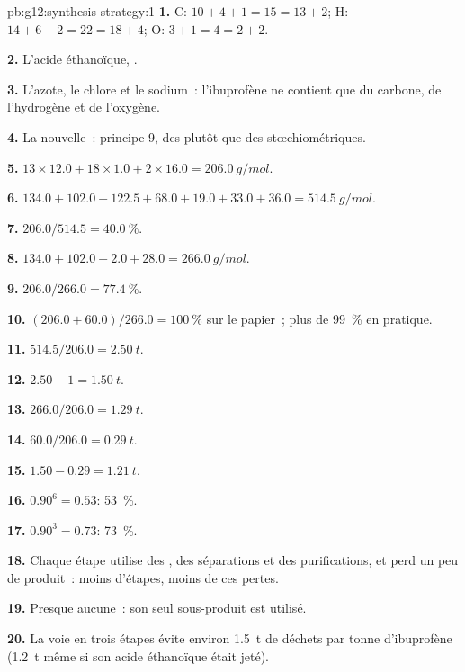 \begin{solution}{pb:g12:synthesis-strategy:1}
\textbf{1.} C: $10 + 4 + 1 = 15 = 13 + 2$; H: $14 + 6 + 2 = 22 = 18 + 4$;
O: $3 + 1 = 4 = 2 + 2$.

\textbf{2.} L'acide éthanoïque, .

\textbf{3.} L'azote, le chlore et le sodium~: l'ibuprofène ne contient
que du carbone, de l'hydrogène et de l'oxygène.

\textbf{4.} La nouvelle~: principe 9, des  plutôt que des
 stœchiométriques.

\textbf{5.} $13 \times 12.0 + 18 \times 1.0 + 2 \times 16.0 =
\qty{206.0}{g/mol}$.

\textbf{6.} $134.0 + 102.0 + 122.5 + 68.0 + 19.0 + 33.0 + 36.0 =
\qty{514.5}{g/mol}$.

\textbf{7.} $206.0/514.5 = \qty{40.0}{\percent}$.

\textbf{8.} $134.0 + 102.0 + 2.0 + 28.0 = \qty{266.0}{g/mol}$.

\textbf{9.} $206.0/266.0 = \qty{77.4}{\percent}$.

\textbf{10.} $(206.0 + 60.0)/266.0 = \qty{100}{\percent}$ sur le
papier~; plus de
\qty{99}{\percent} en pratique.

\textbf{11.} $514.5/206.0 = \qty{2.50}{t}$.

\textbf{12.} $2.50 - 1 = \qty{1.50}{t}$.

\textbf{13.} $266.0/206.0 = \qty{1.29}{t}$.

\textbf{14.} $60.0/206.0 = \qty{0.29}{t}$.

\textbf{15.} $1.50 - 0.29 = \qty{1.21}{t}$.

\textbf{16.} $0.90^6 = 0.53$: \qty{53}{\percent}.

\textbf{17.} $0.90^3 = 0.73$: \qty{73}{\percent}.

\textbf{18.} Chaque étape utilise des , des séparations et des
purifications, et perd un peu de produit~: moins d'étapes, moins de ces
pertes.

\textbf{19.} Presque aucune~: son seul sous-produit est utilisé.

\textbf{20.} La voie en trois étapes évite environ \qty{1.5}{t} de
déchets par tonne d'ibuprofène (\qty{1.2}{t} même si son acide
éthanoïque était jeté).
\end{solution}
